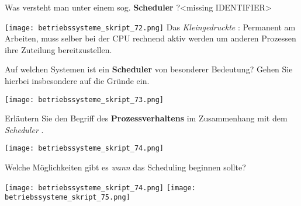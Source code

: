 \documentclass{article}
\begin{document}
\begin{tcolorbox}[colback=white!10!white,colframe=lightgray!75!black,
  savelowerto=\jobname_ex.tex]

\begin{center}
Was versteht man unter einem sog. 
\textbf{Scheduler
}?<missing IDENTIFIER>

\end{center}

\tcblower

\justifying
\texttt{[image: betriebssysteme\_skript\_72.png]}
Das 
\textit{Kleingedruckte
}: 
Permanent am Arbeiten, muss selber bei der CPU rechnend aktiv werden um anderen Prozessen ihre Zuteilung bereitzustellen.

\end{tcolorbox}
\begin{tcolorbox}[colback=white!10!white,colframe=lightgray!75!black,
  savelowerto=\jobname_ex.tex]

\begin{center}
Auf welchen Systemen ist ein 
\textbf{Scheduler
} von besonderer Bedeutung? Gehen Sie hierbei insbesondere auf die Gründe ein.

\end{center}

\tcblower

\justifying
\texttt{[image: betriebssysteme\_skript\_73.png]}

\end{tcolorbox}
\begin{tcolorbox}[colback=white!10!white,colframe=lightgray!75!black,
  savelowerto=\jobname_ex.tex]

\begin{center}
Erläutern Sie den Begriff des 
\textbf{Prozessverhaltens
} im Zusammenhang mit dem 
\textit{Scheduler
}.

\end{center}

\tcblower

\justifying
\texttt{[image: betriebssysteme\_skript\_74.png]}

\end{tcolorbox}
\begin{tcolorbox}[colback=white!10!white,colframe=lightgray!75!black,
  savelowerto=\jobname_ex.tex]

\begin{center}
Welche Möglichkeiten gibt es 
\textit{wann
} das Scheduling beginnen sollte?

\end{center}

\tcblower

\justifying
\texttt{[image: betriebssysteme\_skript\_74.png]}
\texttt{[image: betriebssysteme\_skript\_75.png]}

\end{tcolorbox}
\end{document}
